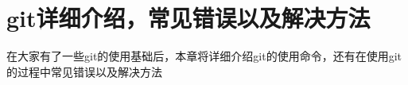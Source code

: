 
\chapter{git详细介绍，常见错误以及解决方法}
\label{chap06}

在大家有了一些git的使用基础后，本章将详细介绍git的使用命令，还有在使用git的过程中常见错误以及解决方法


